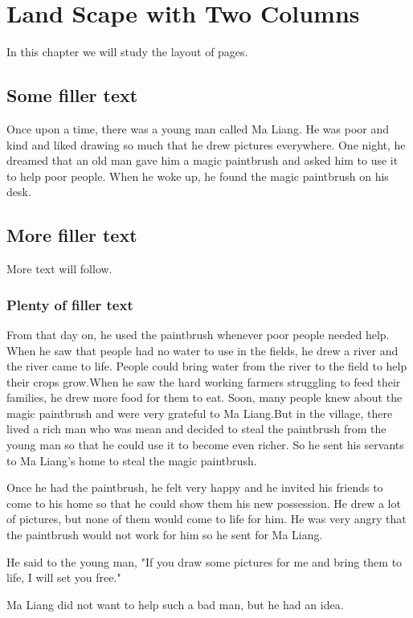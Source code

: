 \documentclass[a4paper,12pt,landscape,twocolumn]{book}
\begin{document}
\chapter{Land Scape with Two Columns}
In this chapter we will study the layout of pages.
\section{Some filler text}
Once upon a time, there was a young man called Ma Liang. He was poor and kind and liked drawing so much that he drew pictures everywhere. One night, he dreamed that an old man gave him a magic paintbrush and asked him to use it to help poor people. When he woke up, he found the magic paintbrush on his desk.
\section{More filler text}
More text will follow.
\subsection{Plenty of filler text}
From that day on, he used the paintbrush whenever poor people needed help. When he saw that people had no water to use in the fields, he drew a river and the river came to life. People could bring water from the river to the field to help their crops grow.When he saw the hard working farmers struggling to feed their families, he drew more food for them to eat. Soon, many people knew about the magic paintbrush and were very grateful to Ma Liang.But in the village, there lived a rich man who was mean and decided to steal the paintbrush from the young man so that he could use it to become even richer. So he sent his servants to Ma Liang's home to steal the magic paintbrush.

Once he had the paintbrush, he felt very happy and he invited his friends to come to his home so that he could show them his new possession. He drew a lot of pictures, but none of them would come to life for him. He was very angry that the paintbrush would not work for him so he sent for Ma Liang.

He said to the young man, "If you draw some pictures for me and bring them to life, I will set you free."

Ma Liang did not want to help such a bad man, but he had an idea.
\end{document}
